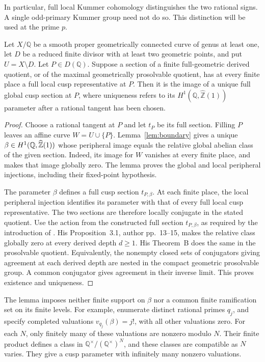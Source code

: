 In particular, full local Kummer cohomology distinguishes the
two rational signs.  A single odd-primary Kummer group need
not do so.  This distinction will be used at the prime \(p\).

\begin{lemma}
\label{lem:allprime-one-cusp}
Let \(X/\mathbb Q\) be a smooth proper geometrically connected curve
of genus at least one, let \(D\) be a reduced finite divisor with at
least two geometric points, and put \(U=X\setminus D\).
Let \(P\in D(\mathbb Q)\).
Suppose a section of a finite full-geometric derived quotient, or
of the maximal geometrically prosolvable quotient, has at every
finite place a full local cusp representative at \(P\).
Then it is the image of a unique full global cusp section at \(P\),
where uniqueness refers to its
\(H^1(\mathbb Q,\widehat{\mathbb Z}(1))\) parameter after a
rational tangent has been chosen.
\end{lemma}

\begin{proof}
Choose a rational tangent at \(P\) and let \(t_P\) be its full section.
Filling \(P\) leaves an affine curve \(W=U\cup\{P\}\).
Lemma~\ref{lem:boundary} gives a unique
\(\beta\in H^1(\mathbb Q,\widehat{\mathbb Z}(1))\) whose peripheral image equals
the relative global abelian class of the given section.
Indeed, its image for \(W\) vanishes at every finite place,
and \citet[Proposition~3.2, author pp.~13--14]{Saidi2022} makes
that image globally zero. The lemma proves the global and local
peripheral injections, including their fixed-point hypothesis.

The parameter \(\beta\) defines a full cusp section \(t_{P,\beta}\).
At each finite place, the local peripheral injection identifies
its parameter with that of every full local cusp representative.
The two sections are therefore locally conjugate in the stated
quotient. Use the action from the constructed full section
\(t_{P,\beta}\), as required by the introduction of
\citet{Saidi2022}. His Proposition~3.1, author pp.~13--15,
makes the relative class globally zero at every derived depth
\(d\ge1\). His Theorem~B does the same in the prosolvable quotient.
Equivalently, the nonempty closed sets of conjugators giving
agreement at each derived depth are nested in the compact
geometric prosolvable group. A common conjugator gives agreement
in their inverse limit. This proves existence and uniqueness.
\end{proof}

The lemma imposes neither finite support on \(\beta\) nor a common
finite ramification set on its finite levels.  For example,
enumerate distinct rational primes \(q_j\), and specify completed
valuations \(v_{q_j}(\beta)=j!\), with all other valuations zero.
For each \(N\), only finitely many of these valuations are
nonzero modulo \(N\).  Their finite product defines a class in
\(\mathbb Q^\times/(\mathbb Q^\times)^N\), and these classes are
compatible as \(N\) varies.  They give a cusp parameter with
infinitely many nonzero valuations.

